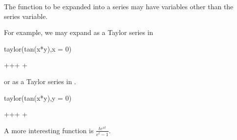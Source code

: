 {{{{{{{{{{{{{{The function to be expanded into a series may have variables other than
the series variable.
%
\begin{xtc}
\begin{xtccomment}
For example, we may expand  as a Taylor series in
\end{xtccomment}
\begin{spadsrc}
taylor(tan(x*y),x = 0)
\end{spadsrc}
\begin{TeXOutput}
\begin{fricasmath}{3}
\TIMES {}+\TIMES {}+\TIMES {}+\TIMES {}%
+%
\end{fricasmath}
\end{TeXOutput}
\end{xtc}
%
\begin{xtc}
\begin{xtccomment}
or as a Taylor series in .
\end{xtccomment}
\begin{spadsrc}
taylor(tan(x*y),y = 0)
\end{spadsrc}
\begin{TeXOutput}
\begin{fricasmath}{4}
\TIMES {}+\TIMES {}+\TIMES {}+\TIMES {}%
+%
\end{fricasmath}
\end{TeXOutput}
\end{xtc}
\begin{xtc}
\begin{xtccomment}
A more interesting function is
$\displaystyle\frac{t e^{x t}}{e^t - 1}$.


\end{xtccomment}
\end{xtc}}}}}}}}}}}}}}}
